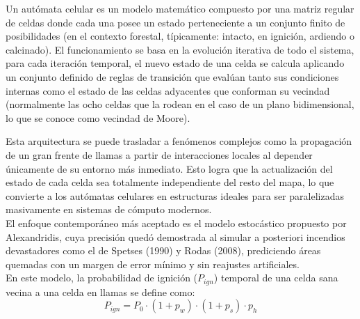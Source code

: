         Un autómata celular es un modelo matemático compuesto por una matriz regular de celdas donde cada una posee un estado perteneciente a un conjunto finito de posibilidades (en el contexto forestal, típicamente: intacto, en ignición, ardiendo o calcinado). El funcionamiento se basa en la evolución iterativa de todo el sistema, para cada iteración temporal, el nuevo estado de una celda se calcula aplicando un conjunto definido de reglas de transición que evalúan tanto sus condiciones internas como el estado de las celdas adyacentes que conforman su vecindad (normalmente las ocho celdas que la rodean en el caso de un plano bidimensional,  lo que se conoce como vecindad de Moore)\cite{automatasCelulares}. 

        Esta arquitectura se puede trasladar a fenómenos complejos como la propagación de un gran frente de llamas a partir de interacciones locales al depender únicamente de su entorno más inmediato. Esto logra que la actualización del estado de cada celda sea totalmente independiente del resto del mapa, lo que convierte a los autómatas celulares en estructuras ideales para ser paralelizadas masivamente en sistemas de cómputo modernos.\\

        El enfoque contemporáneo más aceptado es el modelo estocástico propuesto por Alexandridis\cite{alexandridis2008}, cuya precisión quedó demostrada al simular a posteriori incendios devastadores como el de Spetses (1990) y Rodas (2008), prediciendo áreas quemadas con un margen de error mínimo y sin reajustes artificiales.\\

        En este modelo, la probabilidad de ignición ($P_{ign}$) temporal de una celda sana vecina a una celda en llamas se define como:
        $$P_{ign} = P_0 \cdot (1 + p_w) \cdot (1 + p_s) \cdot p_h$$

